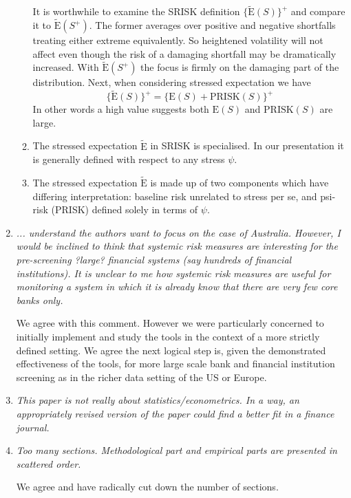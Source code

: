 \documentclass[11pt]{amsart}
\newcommand{\E}{{\mathrm E}}
\newcommand{\Es}{\widetilde\E}
\newcommand{\pr}{\ensuremath{\mathrm{PRISK}}}
\begin{document}
\begin{enumerate}
\begin{enumerate}
It is worthwhile to examine the SRISK definition $\{\Es(S)\}^+$ and compare it to $\Es(S^+)$.  The former averages over positive and negative shortfalls treating either extreme equivalently.   So heightened volatility will not affect even though the risk of a damaging shortfall may be dramatically increased.    With $\Es(S^+)$ the focus is firmly on the damaging part of the distribution.   Next, when considering stressed expectation we have 
$$
\{\Es(S)\}^+ = \{\E(S) + \pr(S)\}^+
$$
In other words a high value suggests both $\E(S)$ and $\pr(S)$ are large.  
\item  The stressed expectation $\Es$ in SRISK is specialised.   In our presentation it is generally defined with respect to any stress $\psi$.
\item  The stressed expectation $\Es$ is made up of two components which have differing interpretation:  baseline risk unrelated to stress per se, and psi-risk (PRISK) defined solely in terms of $\psi$.  
\end{enumerate} 
\item {\it ... understand the authors want to focus on the case of Australia. However, I would be inclined to think that systemic risk measures are interesting for the pre-screening ?large? financial systems (say hundreds of financial institutions). It is unclear to me how systemic risk measures are useful for monitoring a system in which it is already know that there are very few core banks only.}

We agree with this comment.   However we were particularly concerned to initially implement and study the tools in the context of a more strictly defined setting.   We agree the next logical step is, given the demonstrated effectiveness of the tools, for more large scale bank and financial institution screening as in the richer data setting of the US or Europe. 
\item {\it This paper is not really about statistics/econometrics. In a way, an appropriately revised version of the paper could find a better fit in a finance journal.}
\item  {\it Too many sections. Methodological part and empirical parts are presented in scattered order.}

We agree and have radically cut down the number of sections.
\end{enumerate}
\newpage
\end{document}
